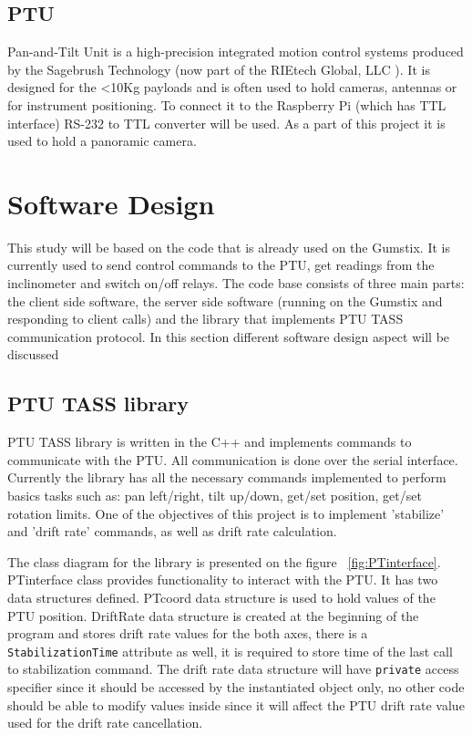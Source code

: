 \subsection{PTU}
Pan-and-Tilt Unit is a high-precision integrated motion control systems produced by the Sagebrush Technology (now part of the RIEtech Global, LLC \cite{RIEtech_Global}). It is designed for the <10Kg payloads and is often used to hold cameras, antennas or for instrument positioning. To connect it to the Raspberry Pi (which has TTL interface) RS-232 to TTL converter will be used. As a part of this project it is used to hold a panoramic camera. 

\section{Software Design}
This study will be based on the code that is already used on the Gumstix. It is currently used to send control commands to the PTU, get readings from the inclinometer and switch on/off relays. The code base consists of three main parts: the client side software, the server side software (running on the Gumstix and responding to client calls) and the library that implements PTU TASS communication protocol. In this section different software design aspect will be discussed

\subsection{PTU TASS library}
PTU TASS library is written in the C++ and implements commands to communicate with the PTU. All communication is done over the serial interface. Currently the library has all the necessary commands implemented to perform basics tasks such as: pan left/right, tilt up/down, get/set position, get/set rotation limits. One of the objectives of this project is to implement 'stabilize' and 'drift rate' commands, as well as drift rate calculation. 

The class diagram for the library is presented on the figure ~\ref{fig:PTinterface}. PTinterface class provides functionality to interact with the PTU. It has two data structures defined. PTcoord data structure is used to hold values of the PTU position. DriftRate data structure is created at the beginning of the program and stores drift rate values for the both axes, there is a \texttt{StabilizationTime} attribute as well, it is required to store time of the last call to stabilization command. The drift rate data structure will have \texttt{private} access specifier since it should be accessed by the instantiated object only, no other code should be able to modify values inside since it will affect the PTU drift rate value used for the drift rate cancellation.

